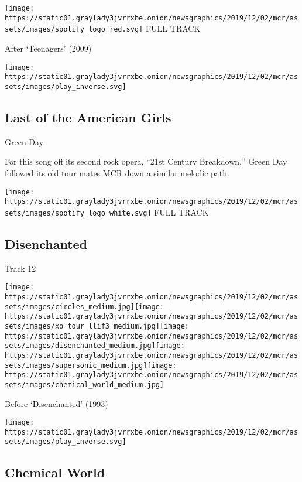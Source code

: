 \href{https://open.spotify.com/track/7j31rVgGX9Q2blT92VBEA0?si=6wiSUMn8SHu1WWOkzHov3w}{}

\texttt{[image: https://static01.graylady3jvrrxbe.onion/newsgraphics/2019/12/02/mcr/assets/images/spotify\_logo\_red.svg]}
FULL TRACK

After `Teenagers' (2009)

\texttt{[image: https://static01.graylady3jvrrxbe.onion/newsgraphics/2019/12/02/mcr/assets/images/play\_inverse.svg]}

\hypertarget{last-of-the-american-girls}{%
\subsection{Last of the American
Girls}\label{last-of-the-american-girls}}

Green Day

For this song off its second rock opera, ``21st Century Breakdown,''
Green Day followed its old tour mates MCR down a similar melodic path.

\href{https://open.spotify.com/track/5Rjm3VIMlxAEIEy5gU2bF7?si=SUtTqc8NQ2e_biEs1qn1ZA}{}

\texttt{[image: https://static01.graylady3jvrrxbe.onion/newsgraphics/2019/12/02/mcr/assets/images/spotify\_logo\_white.svg]}
FULL TRACK

\hypertarget{disenchanted}{%
\subsection{Disenchanted}\label{disenchanted}}

Track 12

\texttt{[image: https://static01.graylady3jvrrxbe.onion/newsgraphics/2019/12/02/mcr/assets/images/circles\_medium.jpg]}\texttt{[image: https://static01.graylady3jvrrxbe.onion/newsgraphics/2019/12/02/mcr/assets/images/xo\_tour\_llif3\_medium.jpg]}\texttt{[image: https://static01.graylady3jvrrxbe.onion/newsgraphics/2019/12/02/mcr/assets/images/disenchanted\_medium.jpg]}\texttt{[image: https://static01.graylady3jvrrxbe.onion/newsgraphics/2019/12/02/mcr/assets/images/supersonic\_medium.jpg]}\texttt{[image: https://static01.graylady3jvrrxbe.onion/newsgraphics/2019/12/02/mcr/assets/images/chemical\_world\_medium.jpg]}

Before `Disenchanted' (1993)

\texttt{[image: https://static01.graylady3jvrrxbe.onion/newsgraphics/2019/12/02/mcr/assets/images/play\_inverse.svg]}

\hypertarget{chemical-world}{%
\subsection{Chemical World}\label{chemical-world}}

